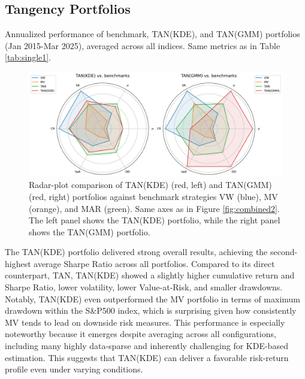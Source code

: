 \subsection{Tangency Portfolios}
\begin{table}[H]
  \centering
  
  \caption[Benchmark vs. TAN(KDE)/TAN(GMM) performance]{Annualized performance of benchmark, TAN(KDE), and TAN(GMM) portfolios (Jan 2015-Mar 2025), averaged across all indices. Same metrics as in Table \ref{tab:single1}.}
  \label{tab:single3}
\end{table}

\vspace{5mm}
\begin{figure}[H]
\begin{center}
\begin{minipage}{1\textwidth}
  \centering
  \includegraphics[width=\textwidth]{images/40_4.png}
\end{minipage}
\caption[Benchmark vs. TAN(KDE)/TAN(GMM) performance - Radar]{Radar-plot comparison of TAN(KDE) (red, left) and TAN(GMM) (red, right) portfolios against benchmark strategies VW (blue), MV (orange), and MAR (green). Same axes as in Figure \ref{fig:combined2}. The left panel shows the TAN(KDE) portfolio, while the right panel shows the TAN(GMM) portfolio.}
\label{fig:combined4}
\end{center}
\end{figure}

The TAN(KDE) portfolio delivered strong overall results, achieving the second-highest average Sharpe Ratio across all portfolios. Compared to its direct counterpart, TAN, TAN(KDE) showed a slightly higher cumulative return and Sharpe Ratio, lower volatility, lower Value-at-Risk, and smaller drawdowns. Notably, TAN(KDE) even outperformed the MV portfolio in terms of maximum drawdown within the S\&P500 index, which is surprising given how consistently MV tends to lead on downside risk measures. This performance is especially noteworthy because it emerges despite averaging across all configurations, including many highly data-sparse and inherently challenging for KDE-based estimation. This suggests that TAN(KDE) can deliver a favorable risk-return profile even under varying conditions.

